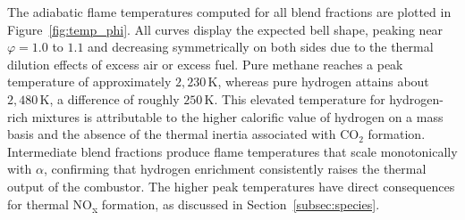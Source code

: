 \documentclass[12pt,a4paper]{article}
\newcommand{\phisym}{\varphi}
\newcommand{\alphasym}{\alpha}
\begin{document}
The adiabatic flame temperatures computed for all blend fractions are plotted in Figure~\ref{fig:temp_phi}. All curves display the expected bell shape, peaking near \(\phisym = 1.0\) to \(1.1\) and decreasing symmetrically on both sides due to the thermal dilution effects of excess air or excess fuel. Pure methane reaches a peak temperature of approximately \(2{,}230\,\mathrm{K}\), whereas pure hydrogen attains about \(2{,}480\,\mathrm{K}\), a difference of roughly \(250\,\mathrm{K}\). This elevated temperature for hydrogen-rich mixtures is attributable to the higher calorific value of hydrogen on a mass basis and the absence of the thermal inertia associated with \(\mathrm{CO_2}\) formation. Intermediate blend fractions produce flame temperatures that scale monotonically with \(\alphasym\), confirming that hydrogen enrichment consistently raises the thermal output of the combustor. The higher peak temperatures have direct consequences for thermal NO\textsubscript{x} formation, as discussed in Section~\ref{subsec:species}.
\end{document}
